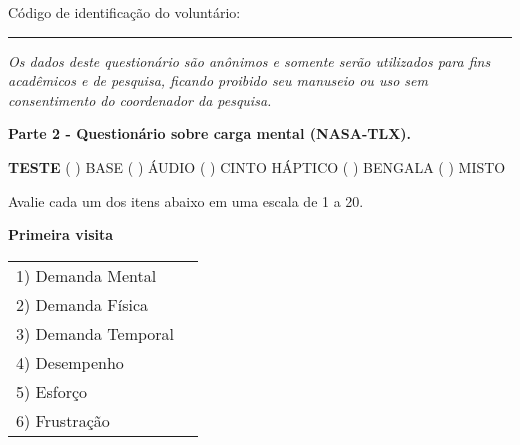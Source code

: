 {\color{gray}

Código de identificação do voluntário: \rule{1in}{.2mm}

\textit{Os dados deste questionário são anônimos e somente serão utilizados para fins acadêmicos e de pesquisa, ficando proibido seu manuseio ou uso sem consentimento do coordenador da pesquisa.}}

\begin{center}
\textbf{Parte 2 - Questionário sobre carga mental (NASA-TLX).}
\end{center}

\noindent
\textbf{TESTE} ( ) BASE \hfill ( ) ÁUDIO \hfill ( ) CINTO HÁPTICO \hfill ( ) BENGALA \hfill ( ) MISTO

Avalie cada um dos itens abaixo em uma escala de 1 a 20.

\hspace{1cm}

%
%
%
%
%
%
%
%
%
%
%
%
%
%
%
%
%
\textbf{Primeira visita}

\begin{table}[!h]
    \centering
    \def\arraystretch{0.5}
    \begin{tabular}{m{} m{}}
        1) Demanda Mental & \\
        2) Demanda Física & \\
        3) Demanda Temporal & \\
        4) Desempenho     & \\
        5) Esforço        & \\
        6) Frustração     & \\
    \end{tabular}
\end{table}

